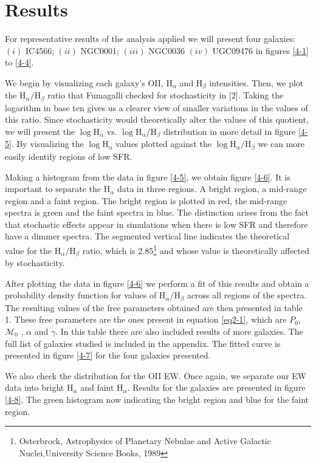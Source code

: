 \chapter{Results}

For representative results of the analysis applied we will present four galaxies: $(i)$ IC4566; $(ii)$ NGC0001; $(iii)$ NGC0036
$(iv)$ UGC09476 in figures \ref{4-1} to \ref{4-4}.

We begin by visualizing each galaxy's OII, H$_{\alpha}$ and H$_{\beta}$ intensities. Then, we plot the H$_{\alpha}/$H$_{\beta}$
ratio that Fumagalli checked for stochasticity in [2]. Taking the logarithm in base ten gives us a clearer view of smaller
variations in the values of this ratio. Since stochasticity would theoretically alter the values of this quotient, we will present
the $\log$H$_{\alpha}$ vs. $\log$H$_{\alpha}/$H$_{\beta}$ distribution in more detail in figure \ref{4-5}. By visualizing the
$\log$H$_{\alpha}$ values plotted against the $\log$H$_{\alpha}/$H$_{\beta}$ we can more easily identify regions of low SFR.

Making a histogram from the data in figure \ref{4-5}, we obtain figure \ref{4-6}. It is important to separate the
H$_{\alpha}$ data in three regions. A bright region, a mid-range region and a faint region. The bright region is plotted in red, the
mid-range spectra is green and the faint spectra in blue. The distinction arises from the fact that stochastic effects appear in
simulations when there is low SFR and therefore have a dimmer spectra. The segmented vertical line indicates the theoretical value
for the H$_{\alpha}/$H$_{\beta}$ ratio, which is 2.85\footnote{Osterbrock, Astrophysics of Planetary Nebulae and Active Galactic Nuclei,University Science Books, 1989}
 and whose value is theoretically affected by stochasticity.

After plotting the data in figure \ref{4-6} we perform a fit of this results and obtain a probability density function for values
of H$_{\alpha}/$H$_{\beta}$ across all regions of the spectra. The resulting values of the free parameters obtained are then
presented in table 1. These free parameters are the ones present in equation \ref{eq2-1}, which are $P_0$, $\mathcal{M}_0$ , $\alpha$ and $\gamma$.
In this table there are also included results of more galaxies. The full list of galaxies studied is included in the appendix. The fitted curve is
presented in figure \ref{4-7} for the four galaxies presented.

We also check the distribution for the OII EW. Once again, we separate our EW data into bright H$_{\alpha}$ and faint H$_{\alpha}$.
Results for the galaxies are presented in figure \ref{4-8}. The green histogram now indicating the bright region and blue for the
faint region. \\

